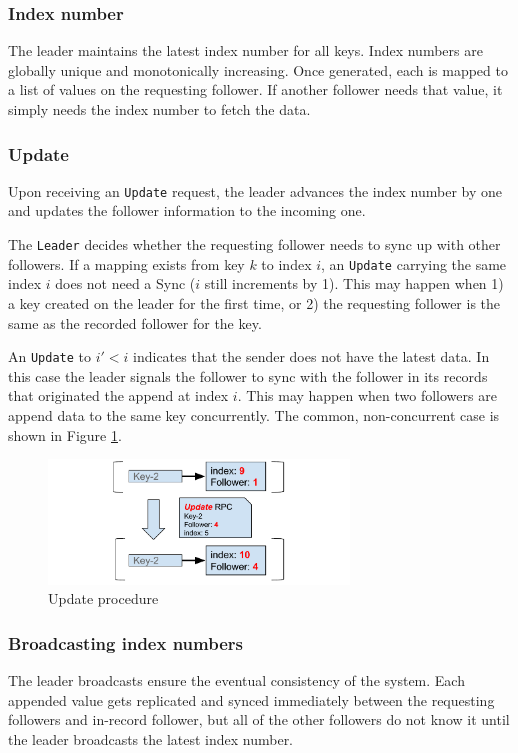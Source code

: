 \documentclass[11pt,english,twocolumn]{article}
\begin{document}
\subsubsection{Index number}
The leader maintains the latest index number for all keys. Index numbers are
globally unique and monotonically increasing. Once generated, each is mapped
to a list of values on the requesting follower. If another follower needs that
value, it simply needs the index number to fetch the data.

\vspace{-0.4cm}
\subsubsection{Update}
Upon receiving an \texttt{Update} request, the leader advances the index
number by one and updates the follower information to the incoming one.

The \texttt{Leader} decides whether the requesting follower needs to sync up
with other followers. If a mapping exists from key $k$ to index $i$, an
\texttt{Update} carrying the same index $i$ does not need a Sync ($i$ still
increments by 1). This may happen when 1) a key created on the leader for the
first time, or 2) the requesting follower is the same as the recorded follower
for the key.

An \texttt{Update} to $i' < i$ indicates that the sender does not have the
latest data. In this case the leader signals the follower to sync with the
follower in its records that originated the append at index $i$. This may happen
when two followers are append data to the same key concurrently. The common,
non-concurrent case is shown in Figure \ref{CommonUpdate}.

\begin{figure}[h]
\includegraphics[width=8cm]{figure/update.pdf}
\caption{Update procedure}
\label{CommonUpdate}
\end{figure}

\vspace{-0.3cm}
\subsubsection{Broadcasting index numbers}
The leader broadcasts ensure the eventual consistency of the system. Each
appended value gets replicated and synced immediately between the requesting
followers and in-record follower, but all of the other followers do not know
it until the leader broadcasts the latest index number. 
\end{document}
